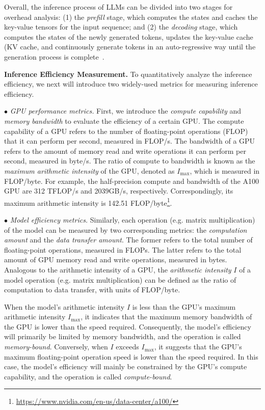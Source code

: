 Overall, the inference process of LLMs can be divided into two stages for overhead analysis:  (1) the \emph{prefill} stage, which computes the states and caches the key-value tensors for the input sequence; and (2) the \emph{decoding} stage, which computes the states of the newly generated tokens, updates the key-value cache (KV cache, and continuously generate tokens in an auto-regressive way until the generation process is complete~\cite{Sheng-ICML-2023-FlexGen}.

\textbf{Inference Efficiency Measurement.} To quantitatively analyze the inference efficiency, we next will introduce two widely-used metrics for measuring inference efficiency. 

$\bullet$ \emph{GPU performance metrics.} First, we introduce the \emph{compute capability} and \emph{memory bandwidth} to evaluate the efficiency of a certain GPU. The compute capability of a GPU refers to the number of floating-point operations (FLOP) that it can perform per second, measured in FLOP/s. The bandwidth of a GPU refers to the amount of memory read and write operations it can perform per second, measured in byte/s. The ratio of compute to bandwidth is known as the \emph{maximum arithmetic intensity} of the GPU, denoted as $I_{\text{max}}$, which is measured in FLOP/byte. For example, the half-precision compute and bandwidth of the A100 GPU are 312 TFLOP/s and 2039GB/s, respectively. Correspondingly, its maximum arithmetic intensity is 142.51 FLOP/byte\footnote{\url{https://www.nvidia.com/en-us/data-center/a100/}}.

$\bullet$ \emph{Model efficiency metrics.} Similarly, each operation (e.g. matrix multiplication) of the model can be measured by two corresponding metrics: the \emph{computation amount} and the \emph{data transfer amount}. The former refers to the total number of floating-point operations, measured in FLOPs. The latter refers to the total amount of GPU memory read and write operations, measured in bytes. Analogous to the arithmetic intensity of a GPU, the \emph{arithmetic intensity} $I$ of a model operation (e.g. matrix multiplication) can be defined as the ratio of computation to data transfer, with units of FLOP/byte. 

When the model's arithmetic intensity $I$ is less than the GPU's maximum arithmetic intensity $I_{\text{max}}$, it indicates that the maximum memory bandwidth of the GPU is lower than the speed required. Consequently, the model's efficiency will primarily be limited by memory bandwidth, and the operation is called  \emph{memory-bound}. 
Conversely, when $I$ exceeds $I_{\text{max}}$, it suggests that the GPU's maximum floating-point operation speed is lower than the speed required. In this case, the model's efficiency will mainly be constrained by the GPU's compute capability, and the operation is called \emph{compute-bound}.

